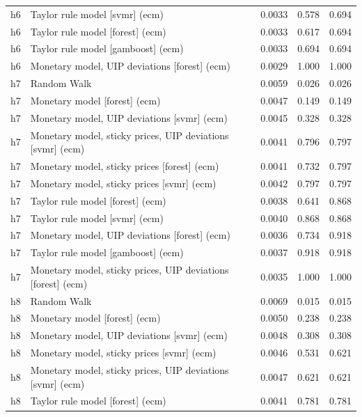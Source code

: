 \begin{ThreePartTable}
\begin{longtable}[t]{cp{5.5cm}ccc}
h6 & \raggedright Taylor rule model [svmr] (ecm) & 0.0033 & 0.578 & 0.694\\
h6 & \raggedright Taylor rule model [forest] (ecm) & 0.0033 & 0.617 & 0.694\\
h6 & \raggedright Taylor rule model [gamboost] (ecm) & 0.0033 & 0.694 & 0.694\\
h6 & \raggedright Monetary model, UIP deviations [forest] (ecm) & 0.0029 & 1.000 & 1.000\\
\addlinespace
h7 & \raggedright Random Walk & 0.0059 & 0.026 & 0.026\\
h7 & \raggedright Monetary model [forest] (ecm) & 0.0047 & 0.149 & 0.149\\
h7 & \raggedright Monetary model, UIP deviations [svmr] (ecm) & 0.0045 & 0.328 & 0.328\\
h7 & \raggedright Monetary model, sticky prices, UIP deviations [svmr] (ecm) & 0.0041 & 0.796 & 0.797\\
h7 & \raggedright Monetary model, sticky prices [forest] (ecm) & 0.0041 & 0.732 & 0.797\\
h7 & \raggedright Monetary model, sticky prices [svmr] (ecm) & 0.0042 & 0.797 & 0.797\\
h7 & \raggedright Taylor rule model [forest] (ecm) & 0.0038 & 0.641 & 0.868\\
h7 & \raggedright Taylor rule model [svmr] (ecm) & 0.0040 & 0.868 & 0.868\\
h7 & \raggedright Monetary model, UIP deviations [forest] (ecm) & 0.0036 & 0.734 & 0.918\\
h7 & \raggedright Taylor rule model [gamboost] (ecm) & 0.0037 & 0.918 & 0.918\\
h7 & \raggedright Monetary model, sticky prices, UIP deviations [forest] (ecm) & 0.0035 & 1.000 & 1.000\\
\addlinespace
h8 & \raggedright Random Walk & 0.0069 & 0.015 & 0.015\\
h8 & \raggedright Monetary model [forest] (ecm) & 0.0050 & 0.238 & 0.238\\
h8 & \raggedright Monetary model, UIP deviations [svmr] (ecm) & 0.0048 & 0.308 & 0.308\\
h8 & \raggedright Monetary model, sticky prices [svmr] (ecm) & 0.0046 & 0.531 & 0.621\\
h8 & \raggedright Monetary model, sticky prices, UIP deviations [svmr] (ecm) & 0.0047 & 0.621 & 0.621\\
h8 & \raggedright Taylor rule model [forest] (ecm) & 0.0041 & 0.781 & 0.781\\

\end{longtable}
\end{ThreePartTable}
